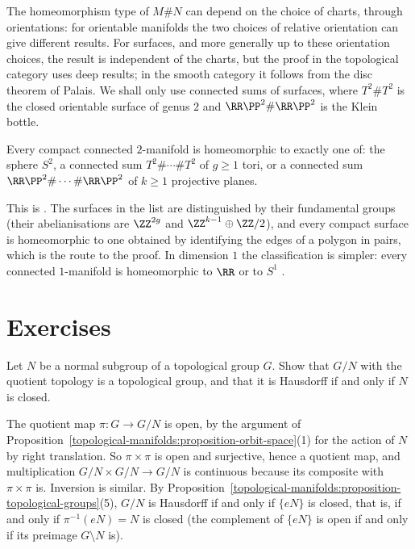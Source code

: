 \begin{remark}\label{topological-manifolds:remark-connected-sum}
The homeomorphism type of $M \# N$ can depend on the choice of charts, through orientations: for orientable manifolds the two choices of relative orientation can give different results. For surfaces, and more
generally up to these orientation choices, the result is independent of the charts, but the proof in the topological category uses deep results; in the smooth category it follows from the disc theorem of Palais.
We shall only use connected sums of surfaces, where $T^2 \# T^2$ is the closed orientable surface of genus $2$ and $\RR\PP^2 \# \RR\PP^2$ is the Klein bottle.
\end{remark}

\begin{theorem}\label{topological-manifolds:theorem-classification-surfaces}
Every compact connected $2$-manifold is homeomorphic to exactly one of: the sphere $S^2$, a connected sum $T^2 \# \cdots \# T^2$ of $g \geq 1$ tori, or a connected sum $\RR\PP^2 \# \cdots \# \RR\PP^2$ of $k \geq 1$ projective planes.
\end{theorem}

This is \cite[Chapter 12]{munkres-topology}. The surfaces in the list are distinguished by their fundamental groups (their abelianisations are $\ZZ^{2g}$ and $\ZZ^{k-1} \oplus \ZZ/2$), and every compact surface is homeomorphic to one
obtained by identifying the edges of a polygon in pairs, which is the route to the proof. In dimension $1$ the classification is simpler: every connected $1$-manifold is homeomorphic to $\RR$ or to $S^1$
\cite[Appendix]{milnor-differential-viewpoint}.

\section{Exercises}\label{topological-manifolds:section-exercises}

\begin{exercise}\label{topological-manifolds:exercise-quotient-group}
Let $N$ be a normal subgroup of a topological group $G$. Show that $G/N$ with the quotient topology is a topological group, and that it is Hausdorff if and only if $N$ is closed.
\end{exercise}

\begin{solution}
The quotient map $\pi \colon G \to G/N$ is open, by the argument of Proposition~\ref{topological-manifolds:proposition-orbit-space}(1) for the action of $N$ by right translation. So $\pi \times \pi$ is open and surjective, hence a
quotient map, and multiplication $G/N \times G/N \to G/N$ is continuous because its composite with $\pi \times \pi$ is. Inversion is similar. By Proposition~\ref{topological-manifolds:proposition-topological-groups}(5), $G/N$ is
Hausdorff if and only if $\{eN\}$ is closed, that is, if and only if $\pi^{-1}(eN) = N$ is closed (the complement of $\{eN\}$ is open if and only if its preimage $G \setminus N$ is).
\end{solution}

